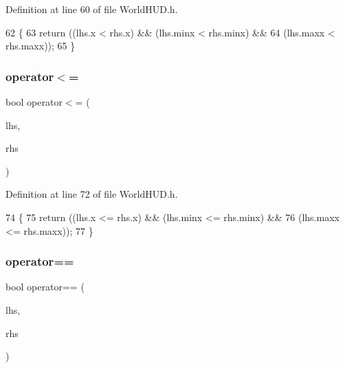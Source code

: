 Definition at line 60 of file World\+H\+U\+D.\+h.


\begin{DoxyCode}
62     \{
63       \textcolor{keywordflow}{return} ((lhs.x < rhs.x) && (lhs.minx < rhs.minx) &&
64               (lhs.maxx < rhs.maxx));
65     \}
\end{DoxyCode}
\mbox{\label{structnjli_1_1_j_l_i_glyph_position_aa0679a354ebebacc7d31aabff0a4e05d}} 
\subsubsection{\texorpdfstring{operator$<$=}{operator<=}}
{\footnotesize\ttfamily bool operator$<$= (\begin{DoxyParamCaption}\item[{const \mbox{\hyperlink{structnjli_1_1_j_l_i_glyph_position}{J\+L\+I\+Glyph\+Position}} \&}]{lhs,  }\item[{const \mbox{\hyperlink{structnjli_1_1_j_l_i_glyph_position}{J\+L\+I\+Glyph\+Position}} \&}]{rhs }\end{DoxyParamCaption})\hspace{0.3cm}{\ttfamily [friend]}}



Definition at line 72 of file World\+H\+U\+D.\+h.


\begin{DoxyCode}
74     \{
75       \textcolor{keywordflow}{return} ((lhs.x <= rhs.x) && (lhs.minx <= rhs.minx) &&
76               (lhs.maxx <= rhs.maxx));
77     \}
\end{DoxyCode}
\mbox{\label{structnjli_1_1_j_l_i_glyph_position_a8c627839571ed060bd66b86b6fdf75e0}} 
\subsubsection{\texorpdfstring{operator==}{operator==}}
{\footnotesize\ttfamily bool operator== (\begin{DoxyParamCaption}\item[{const \mbox{\hyperlink{structnjli_1_1_j_l_i_glyph_position}{J\+L\+I\+Glyph\+Position}} \&}]{lhs,  }\item[{const \mbox{\hyperlink{structnjli_1_1_j_l_i_glyph_position}{J\+L\+I\+Glyph\+Position}} \&}]{rhs }\end{DoxyParamCaption})\hspace{0.3cm}{\ttfamily [friend]}}



